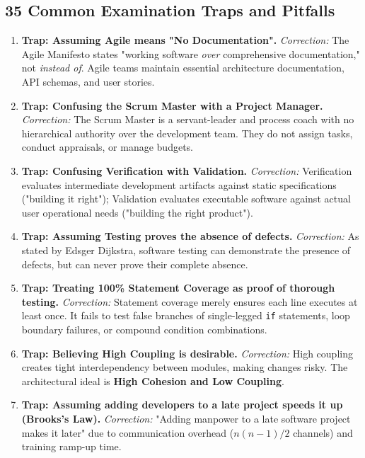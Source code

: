 \subsection*{35 Common Examination Traps and Pitfalls}

\begin{enumerate}[label=\arabic*.,leftmargin=2em]
    \item \textbf{Trap: Assuming Agile means "No Documentation".}
    \textit{Correction:} The Agile Manifesto states "working software \textit{over} comprehensive documentation," not \textit{instead of}. Agile teams maintain essential architecture documentation, API schemas, and user stories.

    \item \textbf{Trap: Confusing the Scrum Master with a Project Manager.}
    \textit{Correction:} The Scrum Master is a servant-leader and process coach with no hierarchical authority over the development team. They do not assign tasks, conduct appraisals, or manage budgets.

    \item \textbf{Trap: Confusing Verification with Validation.}
    \textit{Correction:} Verification evaluates intermediate development artifacts against static specifications ("building it right"); Validation evaluates executable software against actual user operational needs ("building the right product").

    \item \textbf{Trap: Assuming Testing proves the absence of defects.}
    \textit{Correction:} As stated by Edsger Dijkstra, software testing can demonstrate the presence of defects, but can never prove their complete absence.

    \item \textbf{Trap: Treating 100\% Statement Coverage as proof of thorough testing.}
    \textit{Correction:} Statement coverage merely ensures each line executes at least once. It fails to test false branches of single-legged \lstinline|if| statements, loop boundary failures, or compound condition combinations.

    \item \textbf{Trap: Believing High Coupling is desirable.}
    \textit{Correction:} High coupling creates tight interdependency between modules, making changes risky. The architectural ideal is \textbf{High Cohesion and Low Coupling}.

    \item \textbf{Trap: Assuming adding developers to a late project speeds it up (Brooks's Law).}
    \textit{Correction:} "Adding manpower to a late software project makes it later" due to communication overhead ($n(n-1)/2$ channels) and training ramp-up time.


\end{enumerate}
